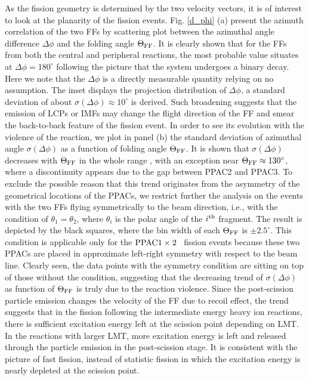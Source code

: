 \documentclass[submitting]{nst}
\def\pacab{${\rm PPAC 1\times 2}$}
\begin{document}
As the fission geometry is determined by the two velocity vectors, it is of interest to look at the planarity of the fission events.  Fig. \ref{d_phi} (a)  present the azimuth correlation of the two FFs by scattering plot between the azimuthal angle difference $\Delta \phi$ and the folding angle $\Theta_{\rm FF}$. It is clearly shown that for the FFs from both the central and peripheral reactions, the most probable value situates at  $\Delta \phi=180^\circ$ following the picture that the system undergoes a  binary decay. Here we note that the  $\Delta \phi$ is a directly measurable quantity relying on no assumption. The inset displays the projection distribution of $\Delta \phi$, a standard deviation of about $\sigma(\Delta \phi)\approx10^\circ$ is derived. Such broadening suggests that the emission of LCPs or IMFs may change the flight direction of the FF and smear the back-to-back feature of the fission event.  In order to see its evolution with the violence of the reaction,   we plot in panel (b) the standard deviation of azimuthal angle  $\sigma(\Delta \phi)$ as a function of folding angle $\Theta_{\rm FF}$.   It is shown that  $\sigma(\Delta \phi)$ decreases with  $\Theta_{\rm FF}$ in the whole range , with an exception near $\Theta_{\rm FF}\approx130^\circ$, where a discontinuity appears due to the gap between PPAC2 and PPAC3.  To exclude the possible reason that this trend originates from the asymmetry of the geometrical locations of the PPACs, we restrict further the analysis on the events with the two FFs flying symmetrically to the beam direction, i.e., with the condition of $\theta_1=\theta_2$, where $\theta_i$ is the polar angle of the $i^{\rm th}$ fragment. The result is depicted by the black squares, where the bin width of each $\Theta_{\rm FF}$ is $\pm 2.5^\circ$. This condition is applicable  only for the \pacab~ fission events because these two PPACs are placed in approximate left-right symmetry with respect to the beam line. Clearly seen, the data points with the symmetry condition are sitting on top of those without the condition, suggesting that the decreasing trend of $\sigma(\Delta \phi)$ as function of $\Theta_{\rm FF}$  is truly due to the reaction violence. Since the post-scission particle emission changes the velocity of the FF due to recoil effect, the trend suggests that in the fission following the intermediate energy heavy ion reactions, there is sufficient excitation energy left at the scission point depending on LMT. In the reactions with larger LMT, more excitation energy is left and released through the particle emission in the post-scission stage. It is consistent with the picture of fast fission, instead of statistic fission in which the excitation energy is nearly depleted at the scission point.
\end{document}
